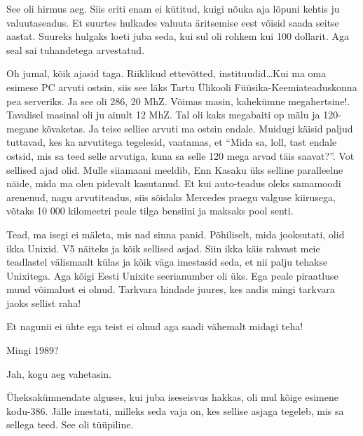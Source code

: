 See oli hirmus aeg. Siis eriti enam ei kütitud, kuigi nõuka aja lõpuni kehtis 
ju  valuutaseadus. Et suurtes hulkades valuuta äritsemise eest võisid saada  
seitse aastat. Suureks hulgaks loeti juba seda, kui sul oli rohkem kui 100 
dollarit. Aga seal sai tuhandetega arvestatud.


Oh jumal, kõik ajasid taga. Riiklikud ettevõtted, instituudid\ldots  Kui ma oma 
esimese PC arvuti ostsin, siis see läks Tartu Ülikooli 
Füüsika-Keemiateaduskonna pea serveriks. Ja see oli 286, 20 MhZ. Võimas masin, 
kahekümne megahertsine!. Tavalisel masinal oli ju ainult 12 MhZ. Tal oli kaks 
megabaiti op mälu ja 120-megane kõvaketas. Ja teise sellise arvuti ma ostsin 
endale. Muidugi käisid paljud tuttavad, kes ka arvutitega tegelesid, vaatamas, 
et \enquote{Mida sa, loll, tast endale ostsid, mis sa teed selle arvutiga, kuna 
sa selle 120 mega arvad täis saavat?}. Vot sellised ajad olid. Mulle siiamaani 
meeldib, Enn Kasaku  üks selline paralleelne näide, mida 
ma olen pidevalt kasutanud. Et kui auto-teadus oleks samamoodi arenenud, nagu 
arvutiteadus, siis sõidaks Mercedes praegu valguse kiirusega, võtaks  10 000 
kilomeetri peale tilga bensiini ja maksaks pool senti.


Tead, ma isegi ei mäleta, mis nad sinna panid. Põhiliselt, mida jooksutati, 
olid ikka Unixid. V5 näiteks ja kõik sellised asjad. Siin 
ikka käis rahvast meie teadlastel välismaalt külas ja kõik väga imestasid seda, 
et nii palju tehakse Unixitega. Aga kõigi Eesti Unixite seerianumber oli üks. 
Ega peale piraatluse muud võimalust ei olnud. Tarkvara hindade juures, kes 
andis mingi tarkvara jaoks sellist raha!


Et nagunii ei ühte ega teist ei olnud aga saadi vähemalt midagi teha!


Mingi 1989? 
                 

Jah, kogu aeg vahetasin. 

Üheksakümnendate alguses, kui juba iseseisvus hakkas, oli mul kõige esimene 
kodu-386. Jälle imestati, milleks seda vaja on, kes sellise asjaga tegeleb, mis 
sa sellega teed. See oli tüüpiline.

